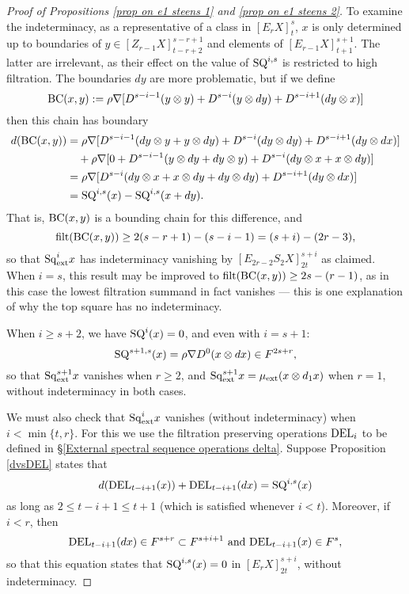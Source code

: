 \documentclass[11pt]{amsart} \renewcommand{\baselinestretch}{1.2}
\theoremstyle{plain}
\numberwithin{equation}{section} %
\theoremstyle{plain}
\numberwithin{equation}{chapter} %
\newcommand{\Nabla}{\nabla}
\newcommand{\Sq}{\mathrm{Sq}}
\newcommand{\E}[5]{[E^{#1}_{#2}#3]^{#4}_{#5}}
\newcommand{\Edownup}[5]{[E_{#1}^{#2}#3]^{#4}_{#5}}
\newcommand{\EZdownup}[5]{[Z^{#2}_{#1}#3]^{#4}_{#5}}
\newcommand{\filt}{\mathrm{filt}}
\begin{document}
\begin{second quadrant homotopy sseq operations}
\begin{proof}[Proof of Propositions \ref{prop on e1 steens 1} and \ref{prop on e1 steens 2}]
To examine the indeterminacy, as a representative of a class in $\Edownup{r}{}{X}{s}{t}$,  $x$ is only determined up to boundaries of $y\in \EZdownup{r-1}{}{X}{s-r+1}{t-r+2}  $ and elements of $\Edownup{r-1}{}{X}{s+1}{t+1}$. The latter are irrelevant, as their effect on the value of $\textup{SQ}^{i,s}$ is restricted to high filtration. The boundaries $dy$ are more problematic, but if we define 
\[\textup{BC}(x,y):=\rho\Nabla [D^{s-i-1}(y\otimes y)+D^{s-i}(y\otimes dy)+D^{s-i+1}(dy\otimes x)]\]
then this chain has boundary
\begin{alignat*}{2}
d(\textup{BC}(x,y))
&=
\rho\Nabla [D^{s-i-1}(dy\otimes y+y\otimes dy)+D^{s-i}(dy\otimes dy)+D^{s-i+1}(dy\otimes dx)]%
\\
&\ \ \ +
\rho\Nabla [0+D^{s-i-1}(y\otimes dy+dy\otimes y)+D^{s-i}(dy\otimes x+x\otimes dy)]%
\\
&=
\rho\Nabla [D^{s-i}(dy\otimes x+x\otimes dy+dy\otimes dy)
+D^{s-i+1}(dy\otimes dx)]\\
&=\textup{SQ}^{i,s}(x)-\textup{SQ}^{i,s}(x+dy).%
\end{alignat*} 
That is, $\textup{BC}(x,y)$ is a bounding chain for this difference, and
\[\filt(\textup{BC}(x,y))\geq 2(s-r+1)-(s-i-1)=(s+i)-(2r-3),\]
so that $\Sq^i_\textup{ext}x$ has indeterminacy vanishing by $\Edownup{2r-2}{}{S_2X}{s+i}{2t}$ as claimed. When $i=s$, this result may be improved to $\filt(\textup{BC}(x,y))\geq 2s-(r-1)$,  as in this case the lowest filtration summand in fact vanishes --- this is one explanation of why the top square has no indeterminacy.

When $i\geq s+2$, we have $\textup{SQ}^{i}(x)=0$, and even with $i=s+1$:
\[\textup{SQ}^{s+1,s}(x)=\rho\nabla D^{0}(x\otimes dx)\in F^{2s+r},\]
so that $\Sq^{s+1}_\textup{ext}x$ vanishes when $r\geq2$,  and $\Sq^{s+1}_\textup{ext}x=\mu_\textup{ext}(x\otimes d_1x)$  when $r=1$, without indeterminacy in both cases. 

We must also check that $\Sq^i_\textup{ext}x$ vanishes (without indeterminacy) when $i<\min\{t,r\}$. For this we use the filtration preserving operations $\textup{DEL}_i$ to be defined in \S\ref{External spectral sequence operations delta}. Suppose   Proposition \ref{dvsDEL} states that
\[d(\textup{DEL}_{t-i+1}(x))+ \textup{DEL}_{t-i+1}(dx)=
\textup{SQ}^{i,s}(x)\]
as long as $2\leq t-i+1\leq t+1$ (which is satisfied whenever $i<t$). Moreover, if $i<r$, then 
\[ \textup{DEL}_{t-i+1}(dx)\in F^{s+r}\subset F^{s+i+1}\textup{ and }\textup{DEL}_{t-i+1}(x)\in F^{s},\]
so that this equation states that $\textup{SQ}^{i,s}(x)=0$ in $\E{}{r}{X}{s+i}{2t}$, without indeterminacy.



\end{proof}
\end{second quadrant homotopy sseq operations}
\end{document}
